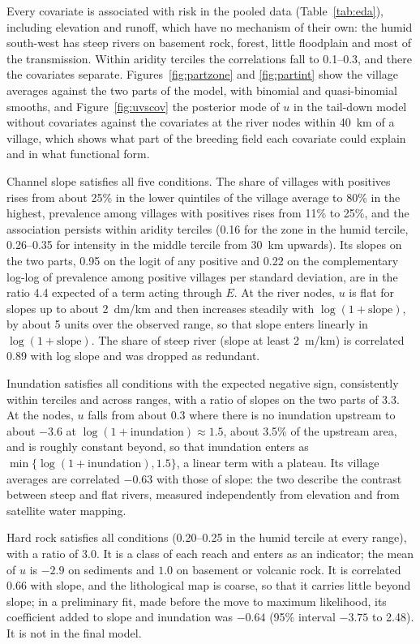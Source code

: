 \documentclass[11pt,a4paper]{article}
\begin{document}
Every covariate is associated with risk in the pooled data (Table~\ref{tab:eda}), including elevation and runoff, which have no mechanism of their own: the humid south-west has steep rivers on basement rock, forest, little floodplain and most of the transmission. Within aridity terciles the correlations fall to 0.1--0.3, and there the covariates separate. Figures~\ref{fig:partzone} and \ref{fig:partint} show the village averages against the two parts of the model, with binomial and quasi-binomial smooths, and Figure~\ref{fig:uvscov} the posterior mode of $u$ in the tail-down model without covariates against the covariates at the river nodes within 40~km of a village, which shows what part of the breeding field each covariate could explain and in what functional form.

Channel slope satisfies all five conditions. The share of villages with positives rises from about 25\% in the lower quintiles of the village average to 80\% in the highest, prevalence among villages with positives rises from 11\% to 25\%, and the association persists within aridity terciles (0.16 for the zone in the humid tercile, 0.26--0.35 for intensity in the middle tercile from 30~km upwards). Its slopes on the two parts, 0.95 on the logit of any positive and 0.22 on the complementary log-log of prevalence among positive villages per standard deviation, are in the ratio 4.4 expected of a term acting through $E$. At the river nodes, $u$ is flat for slopes up to about 2~dm/km and then increases steadily with $\log(1 + \text{slope})$, by about 5 units over the observed range, so that slope enters linearly in $\log(1 + \text{slope})$. The share of steep river (slope at least 2~m/km) is correlated 0.89 with log slope and was dropped as redundant.

Inundation satisfies all conditions with the expected negative sign, consistently within terciles and across ranges, with a ratio of slopes on the two parts of 3.3. At the nodes, $u$ falls from about 0.3 where there is no inundation upstream to about $-3.6$ at $\log(1 + \text{inundation}) \approx 1.5$, about 3.5\% of the upstream area, and is roughly constant beyond, so that inundation enters as $\min\{\log(1 + \text{inundation}), 1.5\}$, a linear term with a plateau. Its village averages are correlated $-0.63$ with those of slope: the two describe the contrast between steep and flat rivers, measured independently from elevation and from satellite water mapping.

Hard rock satisfies all conditions (0.20--0.25 in the humid tercile at every range), with a ratio of 3.0. It is a class of each reach and enters as an indicator; the mean of $u$ is $-2.9$ on sediments and $1.0$ on basement or volcanic rock. It is correlated 0.66 with slope, and the lithological map is coarse, so that it carries little beyond slope; in a preliminary fit, made before the move to maximum likelihood, its coefficient added to slope and inundation was $-0.64$ (95\% interval $-3.75$ to 2.48). It is not in the final model.
\end{document}
